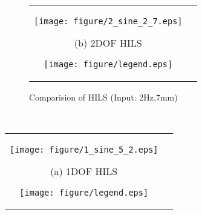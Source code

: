\documentclass{article_vdlab_sotsuron_youshi}
\begin{document}
\vspace*{-3mm}
\begin{figure}[H]
  \hspace*{9mm}
  \begin{tabular}{cc}
  \begin{minipage}{0.7\hsize}
    \begin{center} 
      \texttt{[image: figure/2\_sine\_2\_7.eps]}
      \end{center}
      \begin{center}
      \vspace*{-6mm}
      \ (b) 2DOF HILS\
    \end{center}
  \end{minipage}
  \begin{minipage}{0.3\hsize}
    \hspace*{-12mm}
    \texttt{[image: figure/legend.eps]}
  \end{minipage}
  \end{tabular}
  \vspace*{1mm}
  \caption{Comparision of HILS (Input: 2Hz,7mm)}
  \label{fig:compare_2_7}
\end{figure}

　

\hspace*{5mm}
\begin{tabular}{cc}
  \begin{minipage}{0.7\hsize}
    \begin{center} 
      \texttt{[image: figure/1\_sine\_5\_2.eps]}
      \end{center}
      \begin{center}
      \vspace*{-4mm}
      \ (a) 1DOF HILS\
    \end{center}
  \end{minipage}
  \begin{minipage}{0.3\hsize}
    \hspace*{-12mm}
    \texttt{[image: figure/legend.eps]}
  \end{minipage}
\end{tabular}
\end{document}

